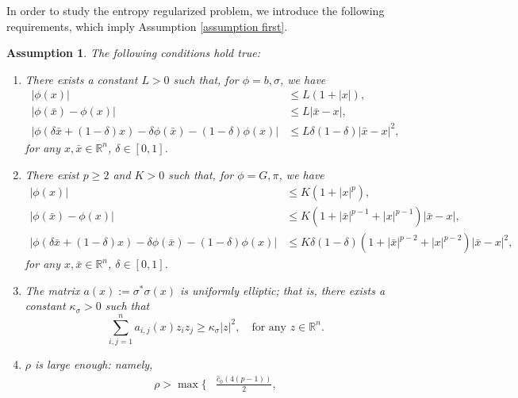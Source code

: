 \documentclass[11pt]{amsart}
\newtheorem{assumption}[theorem]{Assumption}
\theoremstyle{plain}
\numberwithin{equation}{section}
\begin{document}
In order to study the entropy regularized problem, we introduce the following requirements, which imply Assumption \ref{assumption first}. 
\begin{assumption}
    \label{assumption general}
    The following conditions hold true: 
    \begin{enumerate}
    \item\label{condition b sigma} There exists a constant $L>0$ such that, for $\phi = b, \sigma$, we have
    $$ \begin{aligned}
         | \phi (x)| & \leq L (1+|x|),\\ 
        |\phi (\bar x) - \phi (x)|  & \leq L |\bar x - x|, \\
        | \phi ( \delta \bar x + (1-\delta)x) - \delta \phi(\bar x) - (1-\delta) \phi ( x) |  &\leq  L \delta (1-\delta)  |\bar{x}-x|^2,
    \end{aligned}
    $$
    for any $x, \bar x \in \mathbb R ^n$, $\delta \in [0,1]$. 
    \item\label{condition costs} There exist $p\geq 2$ and $K>0$ such that, for $\phi = G, \pi$, we have
    $$
    \begin{aligned}
    |\phi(x)| &\leq K (1+|x|^p), \\
    |\phi (\bar x) - \phi (x) | &\leq K (1+|\bar x|^{p-1} + |x|^{p-1})|\bar x -x |, \\
    |\phi ( \delta \bar x + (1-\delta)x) - \delta \phi(\bar x) - (1-\delta) \phi ( x) | &\leq  K \delta (1-\delta) (1+|\bar x|^{p-2} + |x|^{p-2}) |\bar{x}-x|^2, 
    \end{aligned}
    $$
    for any $x, \bar x \in \mathbb R ^n$, $\delta \in [0,1]$. 
    \item\label{codition ellipticity} The matrix $a(x):=\sigma^* \sigma (x) $ is uniformly elliptic; that is, there exists a constant $\kappa_\sigma >0$ such that 
    $$
    \sum_{i,j=1}^n a_{i,j} (x) z_i z_j \geq \kappa_\sigma |z|^2, \quad \text{for any $z \in \mathbb R ^n$.}
    $$
    \item\label{condition rho} $\rho$ is large enough: namely,
     $$
     \begin{aligned}
    \rho > \max \Big\{ & 
    \frac{\hat c _0 ( 4(p-1))}{2}, 

\end{aligned}$$
\end{enumerate}
\end{assumption}
\end{document}
